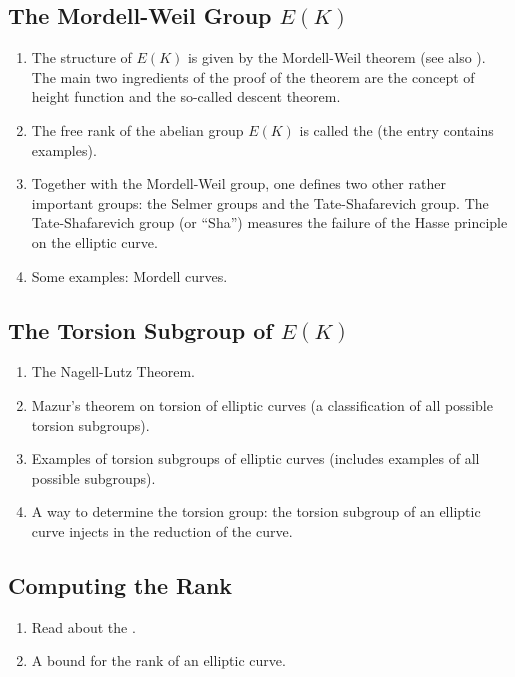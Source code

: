 \documentclass[12pt]{article}
\begin{document}
\subsection{The Mordell-Weil Group $E(K)$}
\begin{enumerate}
\item The structure of $E(K)$ is given by the Mordell-Weil theorem (see also ). The main two ingredients of the proof of the theorem are the concept of height function and the so-called descent theorem.

\item The free rank of the abelian group $E(K)$ is called the  (the entry contains examples).

\item Together with the Mordell-Weil group, one defines two other rather important groups: the Selmer groups and the Tate-Shafarevich group. The Tate-Shafarevich group (or ``Sha'') measures the failure of the Hasse principle on the elliptic curve.

\item Some examples: Mordell curves.
\end{enumerate}

\subsection{The Torsion Subgroup of $E(K)$}
\begin{enumerate}
\item The Nagell-Lutz Theorem.
\item Mazur's theorem on torsion of elliptic curves (a classification of all possible torsion subgroups).
\item Examples of torsion subgroups of elliptic curves (includes examples of all possible subgroups).
\item A way to determine the torsion group: the torsion subgroup of an elliptic curve injects in the reduction of the curve.
\end{enumerate}

\subsection{Computing the Rank}
\begin{enumerate}
\item Read about the .
\item A bound for the rank of an elliptic curve.
\end{enumerate}
\end{document}
